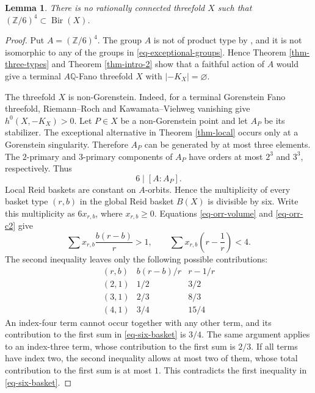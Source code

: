 \documentclass[10pt,oneside,reqno]{amsart}
\numberwithin{equation}{section}
\newtheorem{lemma}[theorem]{Lemma}
\theoremstyle{definition}
\newcommand{\Z}{\mathbb Z}
\newcommand{\Q}{\mathbb Q}
\begin{document}
\begin{lemma}
\label{lem-no-six-four}
There is no rationally connected threefold $X$ such that
$(\Z/6)^4\subset\operatorname{Bir}(X)$.
\end{lemma}

\begin{proof}
Put $A=(\Z/6)^4$.  The group $A$ is not of product type by
\cite[Table 1]{LoginovProduct}, and it is not isomorphic to any of the
groups in \eqref{eq-exceptional-groups}.  Hence Theorem \ref{thm-three-types}  and Theorem \ref{thm-intro-2} show that a
faithful action of $A$ would give a terminal $A\Q$-Fano threefold $X$
with $|-K_X|=\varnothing$.

The threefold $X$ is non-Gorenstein.  Indeed, for a terminal
Gorenstein Fano threefold, Riemann--Roch and Kawamata--Viehweg
vanishing give
$
 h^0(X,-K_X)>0.
$
Let $P\in X$ be a non-Gorenstein point and let $A_P$ be its
stabilizer.  The exceptional alternative in Theorem
\ref{thm-local} occurs only at a Gorenstein singularity.  Therefore
$A_P$ can be generated by at most three elements.  The $2$-primary
and $3$-primary components of $A_P$ have orders at most $2^3$ and
$3^3$, respectively.  Thus
\[
 6\mid[A:A_P].
\]
Local Reid baskets are constant on $A$-orbits.  Hence the multiplicity
of every basket type $(r,b)$ in the global Reid basket $B(X)$ is
divisible by six. Write this multiplicity as $6x_{r,b}$, where
$x_{r,b}\geq0$.  Equations \eqref{eq-orr-volume} and
\eqref{eq-orr-c2} give
\begin{equation}
 \sum x_{r,b}\frac{b(r-b)}r>1,
 \qquad
 \sum x_{r,b}\left(r-\frac1r\right)<4.
 \label{eq-six-basket}
\end{equation}
The second inequality leaves only the following possible
contributions:
\[
\begin{array}{c|c|c}
(r,b)&b(r-b)/r&r-1/r\\ \hline
(2,1)&1/2&3/2\\
(3,1)&2/3&8/3\\
(4,1)&3/4&15/4
\end{array}
\]
An index-four term cannot occur together with any other term, and its
contribution to the first sum in \eqref{eq-six-basket} is $3/4$.  The
same argument applies to an index-three term, whose contribution to
the first sum is $2/3$.  If all terms have index two, the second
inequality allows at most two of them, whose total contribution to the
first sum is at most $1$.  This contradicts the first inequality in
\eqref{eq-six-basket}.
\end{proof}
\end{document}
